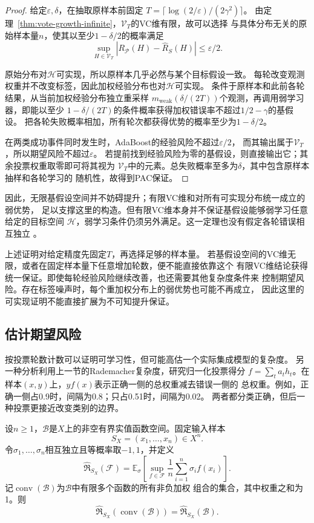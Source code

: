 \begin{proof}
给定$\varepsilon,\delta$，在抽取原样本前固定
$T=\lceil\log(2/\varepsilon)/(2\gamma^2)\rceil$。
由定理~\ref{thm:vote-growth-infinite}，$\mathcal V_T$的VC维有限，故可以选择
与具体分布无关的原始样本量$n$，使其以至少$1-\delta/2$的概率满足
\[
 \sup_{H\in\mathcal V_T}|R_{\mathcal P}(H)-\hat R_S(H)|\leq\varepsilon/2.
\]

原始分布对$\mathcal H$可实现，所以原样本几乎必然与某个目标假设一致。
每轮改变观测权重并不改变标签，因此加权经验分布也对$\mathcal H$可实现。
条件于原样本和此前各轮结果，从当前加权经验分布独立重采样
$m_{\mathrm{weak}}(\delta/(2T))$个观测，再调用弱学习器，即能以至少
$1-\delta/(2T)$的条件概率获得加权错误率不超过$1/2-\gamma$的基假设。
把各轮失败概率相加，所有轮次都获得优势的概率至少为$1-\delta/2$。

在两类成功事件同时发生时，AdaBoost的经验风险不超过$\varepsilon/2$，
而其输出属于$\mathcal V_T$，所以期望风险不超过$\varepsilon$。
若提前找到经验风险为零的基假设，则直接输出它；其余投票权重取零即可将其视为
$\mathcal V_T$中的元素。总失败概率至多为$\delta$，其中包含原样本抽样和各轮学习的
随机性，故得到PAC保证。
\end{proof}

因此，无限基假设空间并不妨碍提升；有限VC维和对所有可实现分布统一成立的弱优势，
足以支撑这里的构造。但有限VC维本身并不保证基假设能够弱学习任意给定的目标空间
$\mathcal H$，弱学习条件仍须另外满足。这一定理也没有假定各轮错误相互独立
。

上述证明对给定精度先固定$T$，再选择足够的样本量。
若基假设空间的VC维无限，或者在固定样本量下任意增加轮数，便不能直接依靠这个
有限VC维结论获得统一保证。即使每轮经验风险继续改善，也还需要其他复杂度条件来
控制期望风险。存在标签噪声时，每个重加权分布上的弱优势也可能不再成立，
因此这里的可实现证明不能直接扩展为不可知提升保证。

\subsection{估计期望风险}

按投票轮数计数可以证明可学习性，但可能高估一个实际集成模型的复杂度。
另一种分析利用上一节的Rademacher复杂度，研究归一化投票得分
$f=\sum_ta_th_t$。在样本$(x,y)$上，$yf(x)$表示正确一侧的总权重减去错误一侧的
总权重。例如，正确一侧占0.9时，间隔为0.8；只占0.51时，间隔为0.02。
两者都分类正确，但后一种投票更接近改变类别的边界。

\begin{theorem}[凸组合的Rademacher复杂度]
\label{thm:learning-ensemble-convex-hull}
设$n\geq1$，$\mathcal B$是$X$上的非空有界实值函数空间。固定输入样本
\[
 S_X=(x_1,\ldots,x_n)\in X^n.
\]
令$\sigma_1,\ldots,\sigma_n$相互独立且等概率取$-1,1$，并定义
\[
 \widehat{\mathfrak R}_{S_X}(\mathcal F)
 =\mathbb E_\sigma\left[\sup_{f\in\mathcal F}
   \frac1n\sum_{i=1}^n\sigma_i f(x_i)\right].
\]
记$\operatorname{conv}(\mathcal B)$为$\mathcal B$中有限多个函数的所有非负加权
组合的集合，其中权重之和为1。则
\[
 \widehat{\mathfrak R}_{S_X}(\operatorname{conv}(\mathcal B))
 =\widehat{\mathfrak R}_{S_X}(\mathcal B).
\]
\end{theorem}


